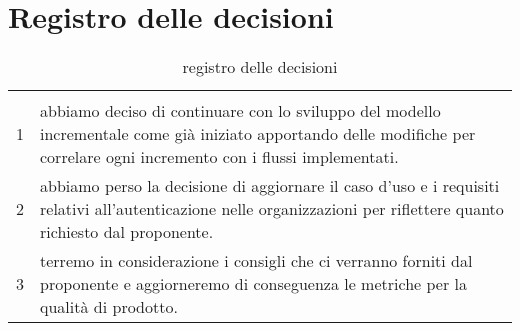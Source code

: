 \documentclass{article}
\begin{document}
\section{Registro delle decisioni}%
\label{sec:registro_delle_decisioni}
\begin{table}[H]
  \centering
  \renewcommand{\arraystretch}{2}
  \begin{tabular}{c b{13cm}}
    \rowcolor{darkgray!90!}\color{white}{\textbf{Codice}} & \color{white}{\textbf{Decisione}}\\
    1 & abbiamo deciso di continuare con lo sviluppo del modello incrementale come già iniziato apportando delle modifiche per correlare ogni incremento con i flussi implementati. \\
    2 & abbiamo perso la decisione di aggiornare il caso d'uso e i requisiti relativi all'autenticazione nelle organizzazioni per riflettere quanto richiesto dal proponente.\\
    3 & terremo in considerazione i consigli che ci verranno forniti dal proponente e aggiorneremo di conseguenza le metriche per la qualità di prodotto. \\

  \end{tabular}
  \caption{registro delle decisioni}%
~~\label{tab:registro delle decisioni}
  \end{table}
\end{document}
